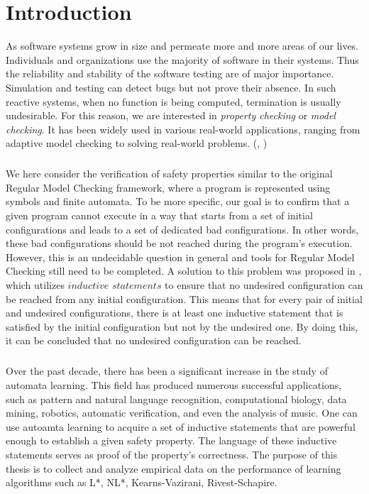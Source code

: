 
\chapter{Introduction}\label{chapter:introduction}
As software systems grow in size and permeate more and more areas of our lives.
Individuals and organizations use the majority of software in their systems. Thus the 
reliability and stability of the software testing are of major importance. Simulation 
and testing can detect bugs but not prove their absence. In such reactive 
systems, when no function is being computed, termination is usually undesirable. For 
this reason, we are interested in \textit{property checking} or \textit{model checking}. 
It has been widely used in various real-world applications, ranging from adaptive 
model checking to solving real-world problems. (\cite*{faster}, \cite*{survey})
\paragraph*{}
We here consider the verification of safety properties similar to the original 
Regular Model Checking framework, where a program is represented using symbols 
and finite automata.
To be more specific, our goal is to confirm that a given program cannot execute 
in a way that starts from a set of initial configurations and leads to a set 
of dedicated bad configurations. 
In other words, these bad configurations should be not reached during the program's execution. 
However, this is an undecidable question in general and tools for Regular Model Checking 
still need to be completed.
A solution to this problem was proposed in \cite*{clarke2009model}, which utilizes 
$\textit{inductive statements}$ to ensure that no undesired configuration can be reached 
from any initial configuration. This means that for every pair of initial 
and undesired configurations, there is at least one inductive statement that 
is satisfied by the initial configuration but not by the undesired one. 
By doing this, it can be concluded that no undesired configuration can be reached.
\paragraph*{}
Over the past decade, there has been a significant increase in the study of automata learning.
This field has produced numerous successful applications, such as pattern and natural language recognition, 
computational biology, data mining, robotics, automatic verification, and even the analysis of music.
One can use autoamta learning to acquire a set of inductive statements that 
are powerful enough to establish a given safety property. The language of these
inductive statements serves as proof of the property's correctness.
The purpose of this thesis is to collect and analyze empirical data on 
the performance of learning algorithms such as L*, NL*, Kearns-Vazirani, Rivest-Schapire.


